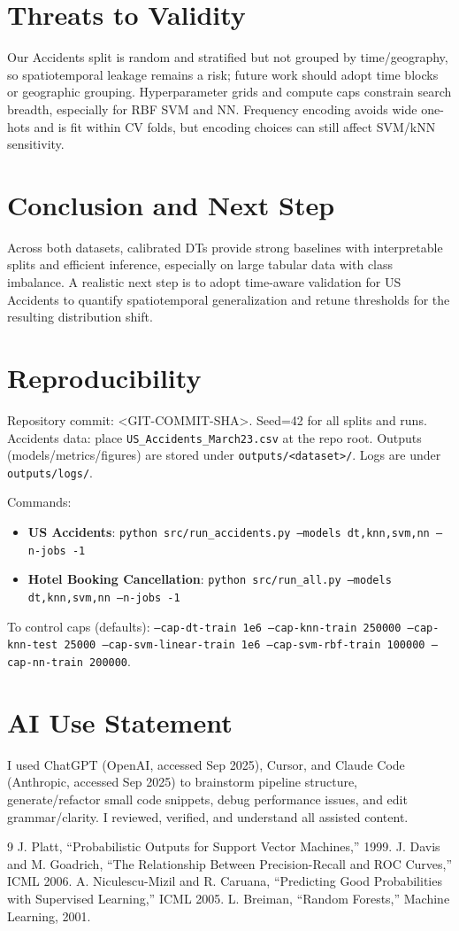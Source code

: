 \documentclass[conference]{IEEEtran}
\newcommand{\datasetA}{Hotel Booking Cancellation}
\newcommand{\datasetB}{US Accidents}
\newcommand{\commitsha}{<GIT-COMMIT-SHA>}
\newcommand{\seed}{42}
\begin{document}
\section{Threats to Validity}
Our Accidents split is random and stratified but not grouped by time/geography, so spatiotemporal leakage remains a risk; future work should adopt time blocks or geographic grouping. Hyperparameter grids and compute caps constrain search breadth, especially for RBF SVM and NN. Frequency encoding avoids wide one-hots and is fit within CV folds, but encoding choices can still affect SVM/kNN sensitivity.

\section{Conclusion and Next Step}
Across both datasets, calibrated DTs provide strong baselines with interpretable splits and efficient inference, especially on large tabular data with class imbalance. A realistic next step is to adopt time-aware validation for \datasetB{} to quantify spatiotemporal generalization and retune thresholds for the resulting distribution shift.

\section*{Reproducibility}
Repository commit: \commitsha. Seed=\seed{} for all splits and runs. Accidents data: place \texttt{US\_Accidents\_March23.csv} at the repo root. Outputs (models/metrics/figures) are stored under \texttt{outputs/<dataset>/}. Logs are under \texttt{outputs/logs/}.

Commands:
\begin{itemize}
\item \textbf{\datasetB{}}: \texttt{python src/run\_accidents.py --models dt,knn,svm,nn --n-jobs -1}
\item \textbf{\datasetA{}}: \texttt{python src/run\_all.py --models dt,knn,svm,nn --n-jobs -1}
\end{itemize}
To control caps (defaults): \texttt{--cap-dt-train 1e6 --cap-knn-train 250000 --cap-knn-test 25000 --cap-svm-linear-train 1e6 --cap-svm-rbf-train 100000 --cap-nn-train 200000}.

\section*{AI Use Statement}
I used ChatGPT (OpenAI, accessed Sep 2025), Cursor, and Claude Code (Anthropic, accessed Sep 2025) to brainstorm pipeline structure, generate/refactor small code snippets, debug performance issues, and edit grammar/clarity. I reviewed, verified, and understand all assisted content.

\begin{thebibliography}{9}
 J. Platt, ``Probabilistic Outputs for Support Vector Machines,'' 1999.
 J. Davis and M. Goadrich, ``The Relationship Between Precision-Recall and ROC Curves,'' ICML 2006.
 A. Niculescu-Mizil and R. Caruana, ``Predicting Good Probabilities with Supervised Learning,'' ICML 2005.
 L. Breiman, ``Random Forests,'' Machine Learning, 2001.
\end{thebibliography}
\end{document}
